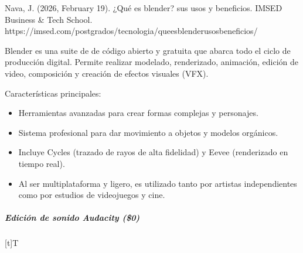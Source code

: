 \documentclass[letterpaper,10pt,spanish]{sphinxmanual}
\let\sphinxpxdimen\pdfpxdimen\else\newdimen\sphinxpxdimen
\begin{document}
\sphinxAtStartPar
%
\begin{footnote}[8]\sphinxAtStartFootnote
Nava, J. (2026, February 19). ¿Qué es blender? sus usos y beneficios. IMSED Business \& Tech School. https://imsed.com/postgrados/tecnologia/que\sphinxhyphen{}es\sphinxhyphen{}blender\sphinxhyphen{}usos\sphinxhyphen{}beneficios/
%
\end{footnote} Blender es una suite de  de código abierto y gratuita que abarca todo el ciclo de producción digital. Permite realizar modelado, renderizado, animación, edición de video, composición y creación de efectos visuales (VFX).

\sphinxAtStartPar
Características principales:
\begin{itemize}
\item {} 
\sphinxAtStartPar
{} Herramientas avanzadas para crear formas complejas y personajes.

\item {} 
\sphinxAtStartPar
{} Sistema profesional para dar movimiento a objetos y modelos orgánicos.

\item {} 
\sphinxAtStartPar
{} Incluye Cycles (trazado de rayos de alta fidelidad) y Eevee (renderizado en tiempo real).

\item {} 
\sphinxAtStartPar
{} Al ser multiplataforma y ligero, es utilizado tanto por artistas independientes como por estudios de videojuegos y cine.

\end{itemize}


\subparagraph{Edición de sonido Audacity (\$0)}
\label{\detokenize{cursos/ofimatica10/recursos/T02:edicion-de-sonido-audacity-0}}

\begin{savenotes}\sphinxattablestart
\sphinxthistablewithglobalstyle
\centering
\begin{tabulary}{\linewidth}[t]{T}
\sphinxtoprule
\sphinxtableatstartofbodyhook

\begin{sphinxfigure-in-table}
\centering
\capstart
\noindent\sphinxincludegraphics[width=360\sphinxpxdimen]{{image091}.png}
\label{\detokenize{cursos/ofimatica10/recursos/T02:id41}}\end{sphinxfigure-in-table}\relax
\\
\sphinxbottomrule
\end{tabulary}
\sphinxtableafterendhook\par
\sphinxattableend\end{savenotes}
\end{document}
